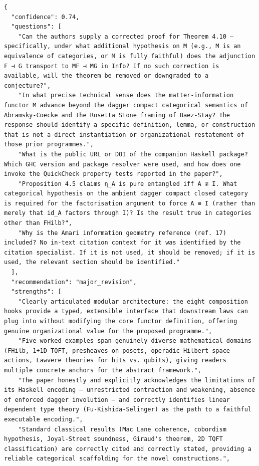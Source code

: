 \documentclass[11pt]{article}
\begin{document}
\begin{verbatim}
{
  "confidence": 0.74,
  "questions": [
    "Can the authors supply a corrected proof for Theorem 4.10 — specifically, under what additional hypothesis on M (e.g., M is an equivalence of categories, or M is fully faithful) does the adjunction F ⊣ G transport to MF ⊣ MG in Info? If no such correction is available, will the theorem be removed or downgraded to a conjecture?",
    "In what precise technical sense does the matter-information functor M advance beyond the dagger compact categorical semantics of Abramsky-Coecke and the Rosetta Stone framing of Baez-Stay? The response should identify a specific definition, lemma, or construction that is not a direct instantiation or organizational restatement of those prior programmes.",
    "What is the public URL or DOI of the companion Haskell package? Which GHC version and package resolver were used, and how does one invoke the QuickCheck property tests reported in the paper?",
    "Proposition 4.5 claims η_A is pure entangled iff A ≇ I. What categorical hypothesis on the ambient dagger compact closed category is required for the factorisation argument to force A ≅ I (rather than merely that id_A factors through I)? Is the result true in categories other than FHilb?",
    "Why is the Amari information geometry reference (ref. 17) included? No in-text citation context for it was identified by the citation specialist. If it is not used, it should be removed; if it is used, the relevant section should be identified."
  ],
  "recommendation": "major_revision",
  "strengths": [
    "Clearly articulated modular architecture: the eight composition hooks provide a typed, extensible interface that downstream laws can plug into without modifying the core functor definition, offering genuine organizational value for the proposed programme.",
    "Five worked examples span genuinely diverse mathematical domains (FHilb, 1+1D TQFT, presheaves on posets, operadic Hilbert-space actions, Lawvere theories for bits vs. qubits), giving readers multiple concrete anchors for the abstract framework.",
    "The paper honestly and explicitly acknowledges the limitations of its Haskell encoding — unrestricted contraction and weakening, absence of enforced dagger involution — and correctly identifies linear dependent type theory (Fu-Kishida-Selinger) as the path to a faithful executable encoding.",
    "Standard classical results (Mac Lane coherence, cobordism hypothesis, Joyal-Street soundness, Giraud's theorem, 2D TQFT classification) are correctly cited and correctly stated, providing a reliable categorical scaffolding for the novel constructions.",

\end{verbatim}
\end{document}
